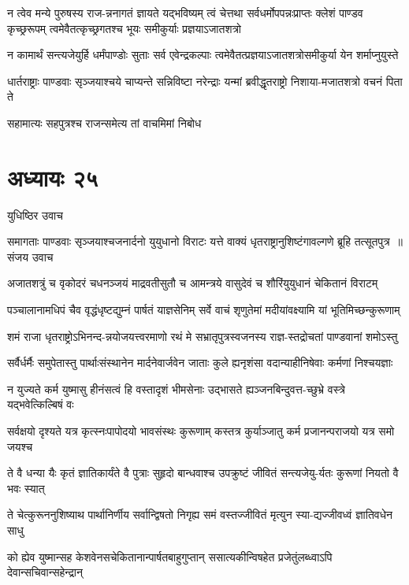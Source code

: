 \threelineshloka
{न त्वेव मन्ये पुरुषस्य राज-न्ननागतं ज्ञायते यद्भविष्यम्}
{त्वं चेत्तथा सर्वधर्मोपपन्नःप्राप्तः क्लेशं पाण्डव कृच्छ्ररूपम्}
{त्वमेवैतत्कृच्छ्रगतश्च भूयः समीकुर्याः प्रज्ञयाऽजातशत्रो}


\twolineshloka
{न कामार्थं सन्त्यजेयुर्हि धर्मंपाण्डोः सुताः सर्व एवेन्द्रकल्पाः}
{त्वमेवैतत्प्रज्ञयाऽजातशत्रोसमीकुर्या येन शर्माप्नुयुस्ते}


\twolineshloka
{धार्तराष्ट्राः पाण्डवाः सृञ्जयाश्चये चाप्यन्ते सन्निविष्टा नरेन्द्राः}
{यन्मां ब्रवीद्धृतराष्ट्रो निशाया-मजातशत्रो वचनं पिता ते}


सहामात्यः सहपुत्रश्च राजन्समेत्य तां वाचमिमां निबोध
\chapter{अध्यायः २५}
\twolineshloka
{युधिष्ठिर उवाच}
{}


\threelineshloka
{समागताः पाण्डवाः सृञ्जयाश्चजनार्दनो युयुधानो विराटः}
{यत्ते वाक्यं धृतराष्ट्रानुशिष्टंगावल्गणे ब्रूहि तत्सूतपुत्र ॥संजय उवाच}
{}


\twolineshloka
{अजातशत्रुं च वृकोदरं चधनञ्जयं माद्रवतीसुतौ च}
{आमन्त्रये वासुदेवं च शौरिंयुयुधानं चेकितानं विराटम्}


\twolineshloka
{पञ्चालानामधिपं चैव वृद्धंधृष्टद्युम्नं पार्षतं याज्ञसेनिम्}
{सर्वे वाचं शृणुतेमां मदीयांवक्ष्यामि यां भूतिमिच्छन्कुरूणाम्}


\twolineshloka
{शमं राजा धृतराष्ट्रोऽभिनन्द-न्नयोजयत्त्वरमाणो रथं मे}
{सभ्रातृपुत्रस्वजनस्य राज्ञ-स्तद्रोचतां पाण्डवानां शमोऽस्तु}


\twolineshloka
{सर्वैर्धर्मैः समुपेतास्तु पार्थाःसंस्थानेन मार्दनेवार्जवेन}
{जाताः कुले ह्यनृशंसा वदान्याहीनिषेवाः कर्मणां निश्चयज्ञाः}


\twolineshloka
{न युज्यते कर्म युष्मासु हीनंसत्वं हि वस्तादृशं भीमसेनाः}
{उद्भासते ह्यञ्जनबिन्दुवत्त-च्छुभ्रे वस्त्रे यद्भवेत्किल्बिषं वः}


\twolineshloka
{सर्वक्षयो दृश्यते यत्र कृत्स्नःपापोदयो भावसंस्थः कुरूणाम्}
{कस्तत्र कुर्याञ्जातु कर्म प्रजानन्पराजयो यत्र समो जयश्च}


\twolineshloka
{ते वै धन्या यैः कृतं ज्ञातिकार्यंते वै पुत्राः सुहृदो बान्धवाश्च}
{उपक्रुष्टं जीवितं सन्त्यजेयु-र्यतः कुरूणां नियतो वै भवः स्यात्}


\twolineshloka
{ते चेत्कुरूननुशिष्याथ पार्थानिर्णीय सर्वान्द्विषतो निगृह्य}
{समं वस्तज्जीवितं मृत्युन स्या-द्यज्जीवध्वं ज्ञातिवधेन साधु}


\twolineshloka
{को ह्येव युष्मान्सह केशवेनसचेकितानान्पार्षतबाहुगुप्तान्}
{ससात्यकीन्विषहेत प्रजेतुंलब्ध्वाऽपि देवान्सचिवान्सहेन्द्रान्}


